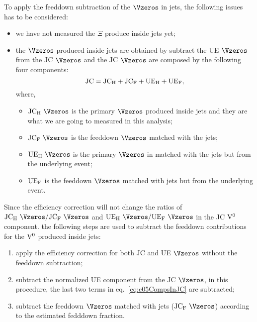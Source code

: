 To apply the feeddown subtraction of the $\Vzeros$ in jets,
the following issues has to be considered:
\begin{itemize}
\item we have not measured the $\Xi$ produce inside jets yet;
\item the $\Vzeros$ produced inside jets are obtained by subtract the
      UE $\Vzeros$ from the JC $\Vzeros$ and the JC $\Vzeros$ are composed
      by the following four components:
      \begin{equation}\label{eq:c05CompsInJC}
      {\rm JC}={\rm JC}_{\rm H}+
               {\rm JC}_{\rm F}+{\rm UE}_{\rm H}+{\rm UE}_{\rm F},
      \end{equation}
      where,
      \begin{itemize}
      \item ${\rm JC}_{\rm H}~\Vzeros$
            is the primary $\Vzeros$ produced inside jets and
            they are what we are going to measured in this analysis;
      \item ${\rm JC}_{\rm F}~\Vzeros$
            is the feeddown $\Vzeros$ matched with the jets;
      \item ${\rm UE}_{\rm H}~\Vzeros$
            is the primary $\Vzeros$ in matched with the jets but
            from the underlying event;
      \item ${\rm UE}_{\rm F}$ is the feeddown $\Vzeros$ matched with jets
            but from the underlying event.
      \end{itemize}
\end{itemize}

Since the efficiency correction will not change the ratios of
${\rm JC}_{\rm H}~\Vzeros/{\rm JC}_{\rm F}~\Vzeros$ and
${\rm UE}_{\rm H}~\Vzeros/{\rm UE}_{\rm F}~\Vzeros$
in the JC ${\rm V}^{0}$ component.
the following steps are used to subtract the feeddown contributions
for the ${\rm V}^{0}$ produced inside jets:
\begin{enumerate}
\item apply the efficiency correction for both JC and UE $\Vzeros$ without
      the feeddown subtraction;
\item subtract the normalized UE component from the JC $\Vzeros$,
      in this procedure,
      the last two terms in eq.~{\ref{eq:c05CompsInJC}} are subtracted;
\item subtract the feeddown $\Vzeros$ matched with
      jets (${\rm JC}_{\rm F}~\Vzeros$) according to the estimated
      fedddown fraction.
\end{enumerate}

